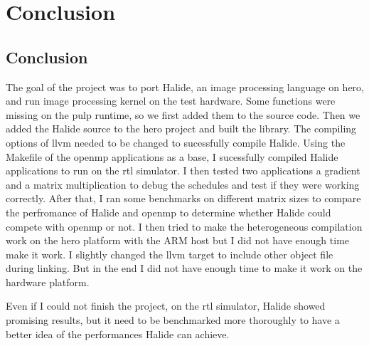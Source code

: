 
\chapter{Conclusion}


\section{Conclusion}
The goal of the project was to port Halide, an image processing language on \gls{hero}, and run image processing kernel on the test hardware.
Some functions were missing on the \gls{pulp} runtime, so we first added them to the source code. 
Then we added the Halide source to the \gls{hero} project and built the library. The compiling options of \gls{llvm} needed to be changed to sucessfully compile Halide.
Using the Makefile of the \gls{openmp} applications as a base, I sucessfully compiled Halide applications to run on the \gls{rtl} simulator.
I then tested two applications a gradient and a matrix multiplication to debug the schedules and test if they were working correctly.
After that, I ran some benchmarks on different matrix sizes to compare the perfromance of Halide and \gls{openmp} to determine whether Halide could compete with \gls{openmp} or not.
I then tried to make the heterogeneous compilation work on the \gls{hero} platform with the ARM host but I did not have enough time make it work. I slightly changed the \gls{llvm} target to include other object file during linking. But in the end I did not have enough time to make it work on the hardware platform.

Even if I could not finish the project, on the \gls{rtl} simulator, Halide showed promising results, but it need to be benchmarked more thoroughly to have a better idea of the performances Halide can achieve.

